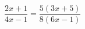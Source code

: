 \begin{ex}[type=equation]
	\begin{condition}
		$\dfrac{2x + 1}{4x - 1} = \dfrac{5(3x + 5)}{8(6x - 1)}$
	\end{condition}
\end{ex}